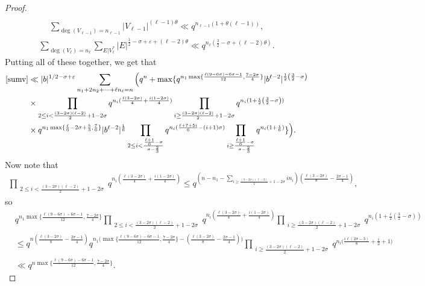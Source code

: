 \documentclass[12pt]{amsart}
\begin{document}
\begin{proof}
\begin{align*}
\end{align*}
\begin{align*}
\sum_{\deg(V_{\ell-1})=n_{\ell-1}} |V_{\ell-1}|^{(\ell-1)\theta}\ll q^{n_{\ell-1}(1+\theta (\ell-1))},
\end{align*}
\begin{align*}
\sum_{\deg(V_{\ell}) = n_{\ell}} \sum_{E | V_{\ell}^{*}} |E|^{\frac{1}{2}-\sigma+\varepsilon+(\ell-2)\theta} \ll q^{n_{\ell}(\frac{3}{2}-\sigma+(\ell-2)\theta)}.
\end{align*}
Putting all of these together, we get that
\begin{align}
\eqref{sumv} & \ll |b|^{1/2-\sigma+\varepsilon} \sum_{n_1+2n_2+\cdots+\ell n_{\ell}=n} \Big( q^n +\max\{ q^{n_1 \max\{ \frac{\ell(9-6\sigma)-6\sigma-1}{12} , \frac{7-2\sigma}{4} \}} |b^{\ell-2}|^{\frac{1}{2}\left(\frac{3}{2}-\sigma\right)}  \nonumber \\
& \times  \prod_{\substack{2 \leq i < { \frac{(3-2\sigma)(\ell-2)}{2}+1-2\sigma }}} q^{n_i (\frac{\ell(3-2\sigma)}{4}+\frac{i(1-2\sigma)}{4} )}  \prod_{\substack{i \geq
{ \frac{(3-2\sigma)(\ell-2)}{2}+1-2\sigma }}} q^{n_i (1+\frac{i}{2}\left(\frac{3}{2}-\sigma\right))}  \nonumber \\
&\times q^{n_1 \max\{ \frac{\ell}{6}-2\sigma+\frac{5}{3}, \frac{7}{6} \}} |b^{\ell-2}|^{\frac{1}{6}} \prod_{2 \leq i< \frac{ \frac{\ell+1}{6} -\sigma}{\sigma-\frac{2}{3}}} q^{n_i ( \frac{\ell+7+5i}{6}-(i+1)\sigma)} \prod_{i \geq  \frac{ \frac{\ell+1}{6} -\sigma}{\sigma-\frac{2}{3}}} q^{n_i (1+\frac{i}{6})} \} \Big).\label{mixedbound}
\end{align}
Now note that 
\begin{align*}
 \prod_{\substack{2 \leq i < { \frac{(3-2\sigma)(\ell-2)}{2}+1-2\sigma }}} q^{n_i (\frac{\ell(3-2\sigma)}{4}+\frac{i(1-2\sigma)}{4} )} \leq q^{\left(n-n_1-\sum_{i \geq  \frac{(3-2\sigma)(\ell-2)}{2}+1-2\sigma } in_i\right) \left(  \frac{ \ell(3-2\sigma)}{8} - \frac{2\sigma-1}{4}\right)},
\end{align*}
so \begin{align*}
&  q^{n_1 \max\{ \frac{\ell(9-6\sigma)-6\sigma-1}{12} , \frac{7-2\sigma}{4} \}}   \prod_{\substack{2 \leq i < { \frac{(3-2\sigma)(\ell-2)}{2}+1-2\sigma }}} q^{n_i (\frac{\ell(3-2\sigma)}{4}+\frac{i(1-2\sigma)}{4} )}  \prod_{\substack{i \geq
{ \frac{(3-2\sigma)(\ell-2)}{2}+1-2\sigma }}} q^{n_i (1+\frac{i}{2}\left(\frac{3}{2}-\sigma\right))} \\
& \leq q^{n  (  \frac{ \ell(3-2\sigma)}{8} - \frac{2\sigma-1}{4})} q^{n_1 \Big(  \max\{ \frac{\ell(9-6\sigma)-6\sigma-1}{12} , \frac{7-2\sigma}{4} \} - ( \frac{\ell(3-2\sigma)}{8}-\frac{2\sigma-1}{4})\Big)} \prod_{\substack{i \geq
{ \frac{(3-2\sigma)(\ell-2)}{2}+1-2\sigma }}} q^{n_i \Big(\frac{i\ell(2\sigma-3)}{8}+\frac{i}{2}+1\Big)} \\
& \ll 
q^{ n \max\{ \frac{\ell(9-6\sigma)-6\sigma-1}{12} , \frac{7-2\sigma}{4} \}}.
\end{align*}


\end{proof}
\end{document}
